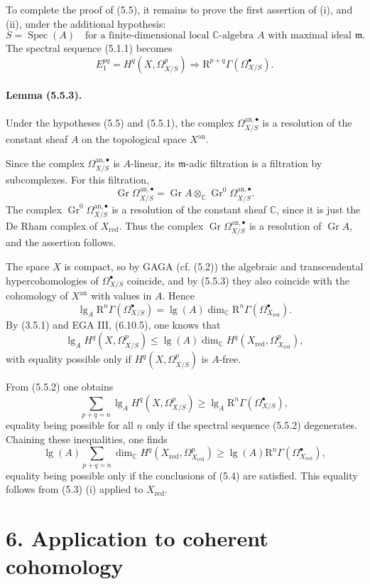 \documentclass[10pt]{article}
\newcommand{\R}{\mathrm R}
\providecommand{\C}{\mathbb C}
\providecommand{\Spec}{\operatorname{Spec}}
\providecommand{\lgop}{\operatorname{lg}}
\providecommand{\an}{\mathrm{an}}
\providecommand{\red}{\mathrm{red}}
\providecommand{\Gr}{\operatorname{Gr}}
\begin{document}
To complete the proof of (5.5), it remains to prove the first assertion of (i), and (ii), under the additional hypothesis:
\[
\tag{5.5.1}
S=\Spec(A)\quad\text{for a finite-dimensional local }\C\text{-algebra }A
\text{ with maximal ideal }\mathfrak m.
\]
The spectral sequence (5.1.1) becomes
\[
\tag{5.5.2}
E_1^{pq}=H^q(X,\Omega_{X/S}^p)\Longrightarrow \R^{p+q}\Gamma(\Omega_{X/S}^\bullet).
\]

\paragraph{Lemma (5.5.3).} Under the hypotheses (5.5) and (5.5.1), the complex $\Omega_{X/S}^{\an,\bullet}$ is a resolution of the constant sheaf $A$ on the topological space $X^{\an}$.

Since the complex $\Omega_{X/S}^{\an,\bullet}$ is $A$-linear, its $\mathfrak m$-adic filtration is a filtration by subcomplexes. For this filtration,
\[
\Gr\Omega_{X/S}^{\an,\bullet}=\Gr A\otimes_\C\Gr^0\Omega_{X/S}^{\an,\bullet}.
\]
The complex $\Gr^0\Omega_{X/S}^{\an,\bullet}$ is a resolution of the constant sheaf $\C$, since it is just the De Rham complex of $X_{\red}$. Thus the complex $\Gr\Omega_{X/S}^{\an,\bullet}$ is a resolution of $\Gr A$, and the assertion follows.

The space $X$ is compact, so by GAGA (cf. (5.2)) the algebraic and transcendental hypercohomologies of $\Omega_{X/S}^\bullet$ coincide, and by (5.5.3) they also coincide with the cohomology of $X^{\an}$ with values in $A$. Hence
\[
\tag{5.5.4}
\lgop_A \R^n\Gamma(\Omega_{X/S}^\bullet)=\lgop(A)\dim_\C \R^n\Gamma(\Omega_{X_{\red}}^\bullet).
\]
By (3.5.1) and EGA III, (6.10.5), one knows that
\[
\tag{5.5.5}
\lgop_A H^q(X,\Omega_{X/S}^p)\le
\lgop(A)\dim_\C H^q(X_{\red},\Omega_{X_{\red}}^p),
\]
with equality possible only if $H^q(X,\Omega_{X/S}^p)$ is $A$-free.

From (5.5.2) one obtains
\[
\tag{5.5.6}
\sum_{p+q=n}\lgop_A H^q(X,\Omega_{X/S}^p)
\ge \lgop_A\R^n\Gamma(\Omega_{X/S}^\bullet),
\]
equality being possible for all $n$ only if the spectral sequence (5.5.2) degenerates. Chaining these inequalities, one finds
\[
\tag{5.5.7}
\lgop(A)\sum_{p+q=n}\dim_\C H^q(X_{\red},\Omega_{X_{\red}}^p)
\ge
\lgop(A)\R^n\Gamma(\Omega_{X_{\red}}^\bullet),
\]
equality being possible only if the conclusions of (5.4) are satisfied. This equality follows from (5.3) (i) applied to $X_{\red}$.

\section*{6. Application to coherent cohomology}
\end{document}
